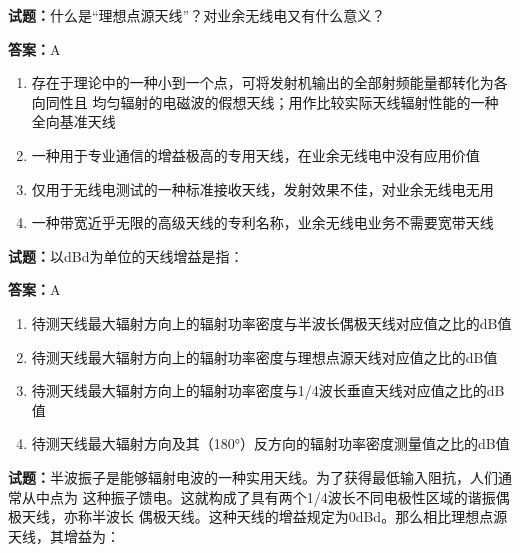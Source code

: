 \documentclass{ctexbook}
\begin{document}
\textbf{试题：}什么是“理想点源天线”？对业余无线电又有什么意义？ 

\textbf{答案：}A 

\begin{enumerate}[leftmargin=3em]
  \item 存在于理论中的一种小到一个点，可将发射机输出的全部射频能量都转化为各向同性且
均匀辐射的电磁波的假想天线；用作比较实际天线辐射性能的一种全向基准天线 

  \item 一种用于专业通信的增益极高的专用天线，在业余无线电中没有应用价值 

  \item 仅用于无线电测试的一种标准接收天线，发射效果不佳，对业余无线电无用 

  \item 一种带宽近乎无限的高级天线的专利名称，业余无线电业务不需要宽带天线 

\end{enumerate}





\vspace{1em}

\textbf{试题：}以dBd为单位的天线增益是指： 

\textbf{答案：}A 

\begin{enumerate}[leftmargin=3em]
  \item 待测天线最大辐射方向上的辐射功率密度与半波长偶极天线对应值之比的dB值 

  \item 待测天线最大辐射方向上的辐射功率密度与理想点源天线对应值之比的dB值 

  \item 待测天线最大辐射方向上的辐射功率密度与1/4波长垂直天线对应值之比的dB值 

  \item 待测天线最大辐射方向及其（180°）反方向的辐射功率密度测量值之比的dB值 

\end{enumerate}





\vspace{1em}

\textbf{试题：}半波振子是能够辐射电波的一种实用天线。为了获得最低输入阻抗，人们通常从中点为
这种振子馈电。这就构成了具有两个1/4波长不同电极性区域的谐振偶极天线，亦称半波长
偶极天线。这种天线的增益规定为0dBd。那么相比理想点源天线，其增益为： 
\end{document}
